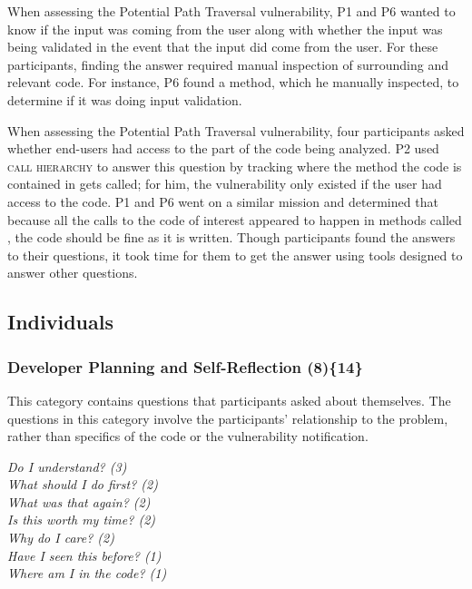 \documentclass{acm_proc_article-sp}
\begin{document}
 
When assessing the Potential Path Traversal vulnerability, P1 and P6 wanted to know if the input was coming from the user along with whether the input was being validated in the event that the input did come from the user.
For these participants, finding the answer required manual inspection of surrounding and relevant code. 
For instance, P6 found a  method, which he manually inspected, to determine if it was doing input validation.

When assessing the Potential Path Traversal vulnerability, four participants asked whether end-users had access to the part of the code being analyzed.
P2 used \textsc{call hierarchy} to answer this question by tracking where the method the code is contained in gets called; for him, the vulnerability only existed if the user had access to the code.
P1 and P6 went on a similar mission and determined that because all the calls to the code of interest appeared to happen in methods called , the code should be fine as it is written.
Though participants found the answers to their questions, it took time for them to get the answer using tools designed to answer other questions.



\subsection{Individuals}
\label{sec:results-i}



\subsubsection{\textbf{Developer Planning and Self-Reflection (8)\{14\}}} \label{dpr}
 
This category contains questions that participants asked about themselves.
The questions in this category involve the participants' relationship to the problem, rather than specifics of the code or the vulnerability notification.


\noindent\emph{Do I understand? (3)} \\
\emph{What should I do first? (2)} \\
\emph{What was that again? (2)} \\
\emph{Is this worth my time? (2)} \\
\emph{Why do I care? (2)} \\
\emph{Have I seen this before? (1)} \\
\emph{Where am I in the code? (1)} 
\end{document}
